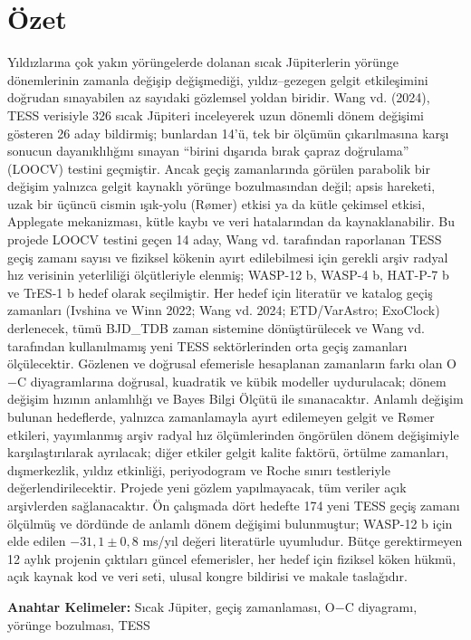 \section*{Özet}
Yıldızlarına çok yakın yörüngelerde dolanan sıcak Jüpiterlerin yörünge dönemlerinin zamanla değişip değişmediği, yıldız–gezegen gelgit etkileşimini doğrudan sınayabilen az sayıdaki gözlemsel yoldan biridir. Wang vd. (2024), TESS verisiyle 326 sıcak Jüpiteri inceleyerek uzun dönemli dönem değişimi gösteren 26 aday bildirmiş; bunlardan 14'ü, tek bir ölçümün çıkarılmasına karşı sonucun dayanıklılığını sınayan “birini dışarıda bırak çapraz doğrulama” (LOOCV) testini geçmiştir. Ancak geçiş zamanlarında görülen parabolik bir değişim yalnızca gelgit kaynaklı yörünge bozulmasından değil; apsis hareketi, uzak bir üçüncü cismin ışık-yolu (Rømer) etkisi ya da kütle çekimsel etkisi, Applegate mekanizması, kütle kaybı ve veri hatalarından da kaynaklanabilir. Bu projede LOOCV testini geçen 14 aday, Wang vd. tarafından raporlanan TESS geçiş zamanı sayısı ve fiziksel kökenin ayırt edilebilmesi için gerekli arşiv radyal hız verisinin yeterliliği ölçütleriyle elenmiş; WASP-12 b, WASP-4 b, HAT-P-7 b ve TrES-1 b hedef olarak seçilmiştir. Her hedef için literatür ve katalog geçiş zamanları (Ivshina ve Winn 2022; Wang vd. 2024; ETD/VarAstro; ExoClock) derlenecek, tümü BJD\_TDB zaman sistemine dönüştürülecek ve Wang vd. tarafından kullanılmamış yeni TESS sektörlerinden orta geçiş zamanları ölçülecektir. Gözlenen ve doğrusal efemerisle hesaplanan zamanların farkı olan O$-$C diyagramlarına doğrusal, kuadratik ve kübik modeller uydurulacak; dönem değişim hızının anlamlılığı ve Bayes Bilgi Ölçütü ile sınanacaktır. Anlamlı değişim bulunan hedeflerde, yalnızca zamanlamayla ayırt edilemeyen gelgit ve Rømer etkileri, yayımlanmış arşiv radyal hız ölçümlerinden öngörülen dönem değişimiyle karşılaştırılarak ayrılacak; diğer etkiler gelgit kalite faktörü, örtülme zamanları, dışmerkezlik, yıldız etkinliği, periyodogram ve Roche sınırı testleriyle değerlendirilecektir. Projede yeni gözlem yapılmayacak, tüm veriler açık arşivlerden sağlanacaktır. Ön çalışmada dört hedefte 174 yeni TESS geçiş zamanı ölçülmüş ve dördünde de anlamlı dönem değişimi bulunmuştur; WASP-12 b için elde edilen $-31{,}1 \pm 0{,}8$ ms/yıl değeri literatürle uyumludur. Bütçe gerektirmeyen 12 aylık projenin çıktıları güncel efemerisler, her hedef için fiziksel köken hükmü, açık kaynak kod ve veri seti, ulusal kongre bildirisi ve makale taslağıdır.

\textbf{Anahtar Kelimeler:} Sıcak Jüpiter, geçiş zamanlaması, O$-$C diyagramı, yörünge bozulması, TESS


